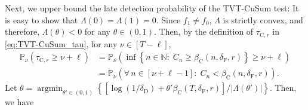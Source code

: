 \documentclass[12pt]{interact}
\newcommand{\lp}{\left(}
\newcommand{\rp}{\right)}
\newcommand{\lb}{\left[}
\newcommand{\rb}{\right]}
\newcommand{\lbp}{\left\{}
\newcommand{\rbp}{\right\}}
\newcommand{\mrm}{\mathrm}
\newcommand{\mbb}{\mathbb}
\newcommand{\E}{\mathbb{E}}
\renewcommand{\Pr}{\mathbb{P}}
\newcommand{\argmin}{\mathop{\mathrm{argmin}}}
\theoremstyle{plain}
\begin{document}
Next, we upper bound the late detection probability of the TVT-CuSum test: It is easy to show that $\Lambda\lp 0 \rp=\Lambda\lp1\rp=0$.
%
%
Since $f_{1}\neq f_{0}$,  $\Lambda$ is strictly convex, and therefore, $\Lambda\lp\theta\rp<0$ for any $\theta\in\lp0,1\rp$. Then, by the definition of $\tau_{\mrm{C}, r}$ in \eqref{eq:TVT-CuSum_tau}, for any $\nu \in \lb T-\ell\rb$,
%
\begin{align}
    \Pr_{\nu}\lp\tau_{\mrm{C}, r}  \geq \nu+\ell\rp 
    &=\Pr_{\nu}\lp\inf\lbp n\in\mbb{N}:\; C_{n}\geq\beta_{\mrm{C}}\lp n,\delta_{\mathrm{F}},r\rp\rbp\geq\nu+\ell\rp\nonumber\\
&=\Pr_{\nu}\left(\forall\,n\in\lb\nu+\ell-1\rb:\;C_{n}<\beta_{\mrm{C}}\lp n,\delta_{\mathrm{F}},r\rp\right).\label{eq:TVT-CuSum_LD_1}
\end{align}
%
Let $\theta = \argmin_{\theta' \in \lp 0,1 \rp} \lbp\lb\log\lp1/\delta_{\mathrm{D}}\rp+\theta'\beta_{\mrm{C}}\lp T, \delta_{\mrm{F}}, r\rp\rb/\lvert\Lambda\lp\theta'\rp\rvert\rbp$. Then, we have
%
\end{document}
